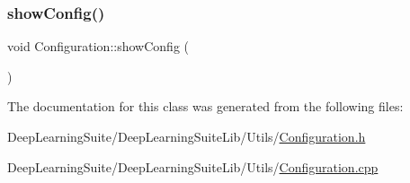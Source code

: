 \mbox{\label{class_configuration_a73507806e263d80e7ef3c0ae33bb460f}} 
\subsubsection{\texorpdfstring{show\+Config()}{showConfig()}}
{\footnotesize\ttfamily void Configuration\+::show\+Config (\begin{DoxyParamCaption}{ }\end{DoxyParamCaption})}



The documentation for this class was generated from the following files\+:\begin{DoxyCompactItemize}
\item 
Deep\+Learning\+Suite/\+Deep\+Learning\+Suite\+Lib/\+Utils/\hyperlink{_configuration_8h}{Configuration.\+h}\item 
Deep\+Learning\+Suite/\+Deep\+Learning\+Suite\+Lib/\+Utils/\hyperlink{_configuration_8cpp}{Configuration.\+cpp}\end{DoxyCompactItemize}
